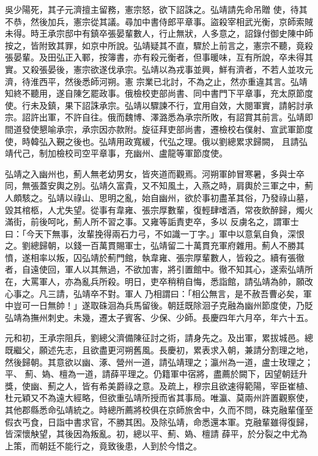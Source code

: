 \begin{pinyinscope}
 吳少陽死，其子元濟擅主留務，憲宗怒，欲下詔誅之。弘靖請先命吊贈
 使，待其不恭，然後加兵，憲宗從其議。尋加中書侍郎平章事。盜殺宰相武光衡，京師索賊未得。時王承宗邸中有鎮卒張晏輩數人，行止無狀，人多意之，詔錄付御史陳中師按之，皆附致其罪，如京中所說。弘靖疑其不直，驟於上前言之，憲宗不聽，竟殺張晏輩。及田弘正入鄆，按簿書，亦有殺元衡者，但事暖味，互有所說，卒未得其實。又殺張晏後，憲宗欲遂伐承宗。弘靖以為戎事並興，鮮有濟者，不若人並攻元濟，待淮西平，然後悉師河朔。憲
 宗業已北討，不為之止，然亦重違其言。弘靖知終不聽用，遂自陳乞罷政事。俄檢校吏部尚書、同中書門下平章事，充太原節度使。行未及鎮，果下詔誅承宗。弘靖以驟諫不行，宜用自效，大閱軍實，請躬討承宗。詔許出軍，不許自往。俄而魏博、澤潞悉為承宗所敗，有詔賞其前言。弘靖即間道發使懇喻承宗，承宗因亦款附。旋征拜吏部尚書，遷檢校右僕射、宣武軍節度使，時韓弘入覲之後也。弘靖用政寬緩，代弘之理。俄以劉總累求歸闕，
 且請弘靖代己，制加檢校司空平章事，充幽州、盧龍等軍節度使。



 弘靖之入幽州也，薊人無老幼男女，皆夾道而觀焉。河朔軍帥冒寒暑，多與士卒同，無張蓋安輿之別。弘靖久富貴，又不知風土，入燕之時，肩輿於三軍之中，薊人頗駭之。弘靖以祿山、思明之亂，始自幽州，欲於事初盡革其俗，乃發祿山墓，毀其棺柩，人尤失望。從事有韋雍、張宗厚數輩，復輕肆嗜酒，常夜飲醉歸，燭火滿街，前後呵叱，薊人所不習之事。又雍等詬責吏卒，多以
 反虜名之，謂軍士曰：「今天下無事，汝輩挽得兩石力弓，不如識一丁字。」軍中以意氣自負，深恨之。劉總歸朝，以錢一百萬貫賜軍士，弘靖留二十萬貫充軍府雜用。薊人不勝其憤，遂相率以叛，囚弘靖於薊門館，執韋雍、張宗厚輩數人，皆殺之。續有張徹者，自遠使回，軍人以其無過，不欲加害，將引置館中。徹不知其心，遂索弘靖所在，大罵軍人，亦為亂兵所殺。明日，吏卒稍稍自悔，悉詣館，請弘靖為帥，願改心事之。凡三請，弘靖卒不對。軍人
 乃相謂曰：「相公無言，是不赦吾曹必矣，軍中豈可一日無帥！」遂取硃洄為兵馬留後。朝廷既除洄子克融為幽州節度使，乃貶弘靖為撫州刺史。未幾，遷太子賓客、少保、少師。長慶四年六月卒，年六十五。



 元和初，王承宗阻兵，劉總父濟備陳征討之術，請身先之。及出軍，累拔城邑。總既繼父，願述先志，且欲盡更河朔舊風。長慶初，累表求入朝，兼請分割理之地，然後歸朝。其意欲以幽、涿、營州一道，請弘靖理之；瀛州為一道，盧士玫理之；平、
 薊、媯、檀為一道，請薛平理之。仍籍軍中宿將，盡薦於闕下，因望朝廷升獎，使幽、薊之人，皆有希美爵祿之意。及疏上，穆宗且欲速得範陽，宰臣崔植、杜元穎又不為遠大經略，但欲重弘靖所授而省其事局。唯瀛、莫兩州許置觀察使，其他郡縣悉命弘靖統之。時總所薦將校俱在京師旅舍中，久而不問，硃克融輩僅至假衣丐食，日詣中書求官，不勝其困。及除弘靖，命悉還本軍。克融輩雖得復歸，皆深懷觖望，其後因為叛亂。初，總以平、薊、媯、檀請
 薛平，於分裂之中尤為上策，而朝廷不能行之，竟致後患，人到於今惜之。




\end{pinyinscope}

